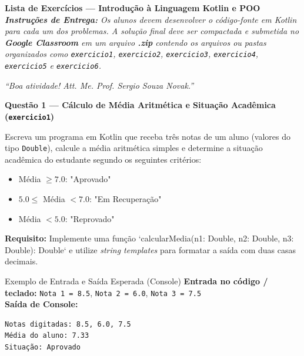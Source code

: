 \documentclass[12pt]{article}
\begin{document}
\vspace*{0.2cm}

\begin{center}
  {\Large \textbf{Lista de Exercícios — Introdução à Linguagem Kotlin e POO}}\\[0.2cm]
  \textit{\textbf{Instruções de Entrega:} Os alunos devem desenvolver o código-fonte em Kotlin para cada um dos problemas. A solução final deve ser compactada e submetida no \textbf{Google Classroom} em um arquivo \textbf{.zip} contendo os arquivos ou pastas organizados como \texttt{exercicio1}, \texttt{exercicio2}, \texttt{exercicio3}, \texttt{exercicio4}, \texttt{exercicio5} e \texttt{exercicio6}.}
\end{center}

\vspace{0.4cm}

\begin{center}
  \textit{``Boa atividade! Att. Me. Prof. Sergio Souza Novak.''}
\end{center}

\vspace{0.4cm}

\noindent\textbf{Questão 1 — Cálculo de Média Aritmética e Situação Acadêmica (\texttt{exercicio1})}

\vspace{0.2cm}
\noindent
Escreva um programa em Kotlin que receba três notas de um aluno (valores do tipo \texttt{Double}), calcule a média aritmética simples e determine a situação acadêmica do estudante segundo os seguintes critérios:
\begin{itemize}[leftmargin=1.5em]
  \item Média $\ge 7.0$: "Aprovado"
  \item $5.0 \le$ Média $< 7.0$: "Em Recuperação"
  \item Média $< 5.0$: "Reprovado"
\end{itemize}
\textbf{Requisito:} Implemente uma função `calcularMedia(n1: Double, n2: Double, n3: Double): Double` e utilize \textit{string templates} para formatar a saída com duas casas decimais.

\vspace{0.2cm}
\begin{block}{Exemplo de Entrada e Saída Esperada (Console)}
\textbf{Entrada no código / teclado:} \texttt{Nota 1 = 8.5}, \texttt{Nota 2 = 6.0}, \texttt{Nota 3 = 7.5}\\
\textbf{Saída de Console:}
\begin{verbatim}
Notas digitadas: 8.5, 6.0, 7.5
Média do aluno: 7.33
Situação: Aprovado
\end{verbatim}
\end{block}
\end{document}

